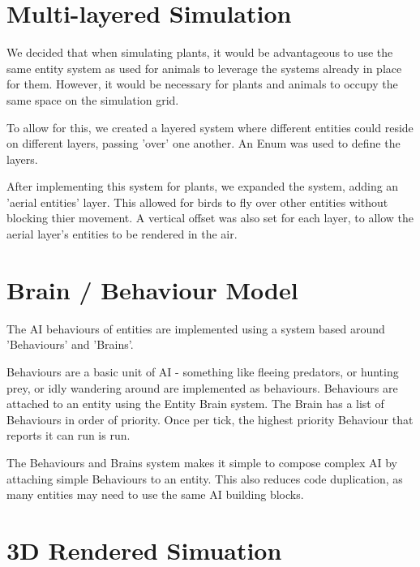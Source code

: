 \documentclass{article}
\begin{document}
\begin{multicols}{2}
        \section{Multi-layered Simulation}
        We decided that when simulating plants, it would be advantageous to use the same entity system as used for animals to leverage the systems already in place for them. However, it would be necessary for plants and animals to occupy the same space on the simulation grid. 
        
        To allow for this, we created a layered system where different entities could reside on different layers, passing 'over' one another. An Enum was used to define the layers.
        
        After implementing this system for plants, we expanded the system, adding an 'aerial entities' layer. This allowed for birds to fly over other entities without blocking thier movement. A vertical offset was also set for each layer, to allow the aerial layer's entities to be rendered in the air.

        \section{Brain / Behaviour Model}

        The AI behaviours of entities are implemented using a system based around 'Behaviours' and 'Brains'.
        
        Behaviours are a basic unit of AI - something like fleeing predators, or hunting prey, or idly wandering around are implemented as behaviours. Behaviours are attached to an entity using the Entity Brain system. The Brain has a list of Behaviours in order of priority. Once per tick, the highest priority Behaviour that reports it can run is run.
        
        The Behaviours and Brains system makes it simple to compose complex AI by attaching simple Behaviours to an entity. This also reduces code duplication, as many entities may need to use the same AI building blocks.

        \section{3D Rendered Simuation}


\end{multicols}
\end{document}
